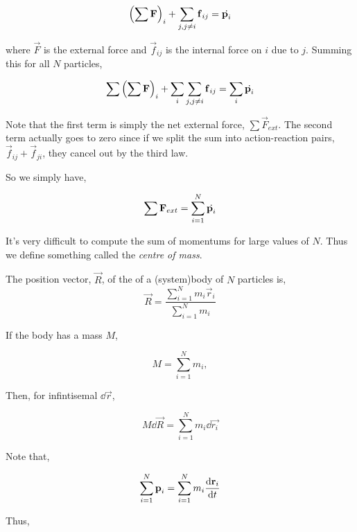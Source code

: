 \begin{equation*}
    \qty(\sum \mathbf{F})_i + \sum_{j, j \ne i} \boldsymbol{\mathbf{f}}_{ij} = \dot{\boldsymbol{\mathbf{p}}_i}
\end{equation*}

where \(\Vec{F}\) is the external force and \(\vec{f}_{ij}\) is the internal force
on \(i\) due to \(j\). Summing this for all \(N\) particles, 

\begin{equation*}
    \sum\qty(\sum \mathbf{F})_i + \sum_{i}\sum_{j, j \ne i} \boldsymbol{\mathbf{f}}_{ij} = \sum_i\dot{\boldsymbol{\mathbf{p}}_i}
\end{equation*}

Note that the first term is simply the net external force, \(\sum\Vec{F}_{ext}\). The second 
term actually goes to zero since if we split the sum into action-reaction pairs,
\(\vec{f}_{ij} + \vec{f}_{ji}\), they cancel out by the third law. 

So we simply have, 

\begin{equation*}
    \sum \mathbf{F}_{ext} = \sum_{i=1}^N\dot{\boldsymbol{\mathbf{p}}_i}
\end{equation*}

It's very difficult to compute the sum of momentums for large values of \(N\). Thus
we define something called the \emph{centre of mass}.

\begin{definition}
    \label{def: com}
    The position vector, \(\Vec{R}\), of the  of a (system)body of \(N\) particles is,
    \begin{equation}
        \Vec{R} = \frac{\sum_{i=1}^N m_i\vec{r}_i}{\sum_{i=1}^N m_i}
    \end{equation} 
\end{definition}

If the body has a mass \(M\), 

\[M = \sum_{i=1}^N m_i,\]

Then, for infintisemal \(\dd{\vec{r}}\), 

\begin{equation*}
    M\dd{\vec{R}} = \sum_{i=1}^N m_i\dd{\vec{r_i}}
\end{equation*}

Note that, 

\begin{equation*}
    \sum_{i=1}^N \boldsymbol{\mathbf{p}}_i = \sum_{i=1}^N m_i \dv{\boldsymbol{\mathbf{r}}_i}{t}
\end{equation*}

Thus,

